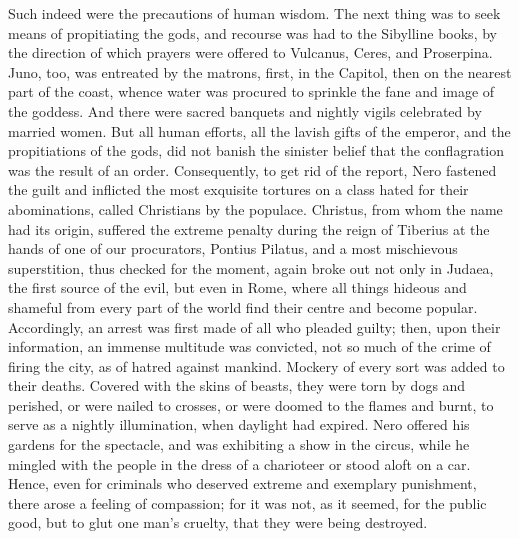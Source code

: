 Such indeed were the precautions of human wisdom. The next thing was to seek means of propitiating the gods, and recourse was had to the Sibylline books, by the direction of which prayers were offered to Vulcanus, Ceres, and Proserpina. Juno, too, was entreated by the matrons, first, in the Capitol, then on the nearest part of the coast, whence water was procured to sprinkle the fane and image of the goddess. And there were sacred banquets and nightly vigils celebrated by married women. But all human efforts, all the lavish gifts of the emperor, and the propitiations of the gods, did not banish the sinister belief that the conflagration was the result of an order. Consequently, to get rid of the report, Nero fastened the guilt and inflicted the most exquisite tortures on a class hated for their abominations, called Christians by the populace. Christus, from whom the name had its origin, suffered the extreme penalty during the reign of Tiberius at the hands of one of our procurators, Pontius Pilatus, and a most mischievous superstition, thus checked for the moment, again broke out not only in Judaea, the first source of the evil, but even in Rome, where all things hideous and shameful from every part of the world find their centre and become popular. Accordingly, an arrest was first made of all who pleaded guilty; then, upon their information, an immense multitude was convicted, not so much of the crime of firing the city, as of hatred against mankind. Mockery of every sort was added to their deaths. Covered with the skins of beasts, they were torn by dogs and perished, or were nailed to crosses, or were doomed to the flames and burnt, to serve as a nightly illumination, when daylight had expired. Nero offered his gardens for the spectacle, and was exhibiting a show in the circus, while he mingled with the people in the dress of a charioteer or stood aloft on a car. Hence, even for criminals who deserved extreme and exemplary punishment, there arose a feeling of compassion; for it was not, as it seemed, for the public good, but to glut one man's cruelty, that they were being destroyed.


